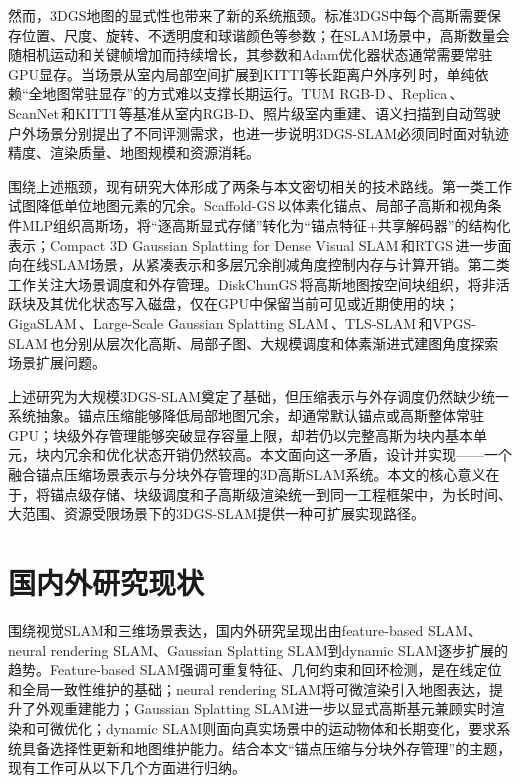 然而，3DGS地图的显式性也带来了新的系统瓶颈。标准3DGS中每个高斯需要保存位置、尺度、旋转、不透明度和球谐颜色等参数；在SLAM场景中，高斯数量会随相机运动和关键帧增加而持续增长，其参数和Adam优化器状态通常需要常驻GPU显存。当场景从室内局部空间扩展到KITTI等长距离户外序列\,\cite{Geiger2012CVPR}时，单纯依赖“全地图常驻显存”的方式难以支撑长期运行。TUM RGB-D\,\cite{sturm2012tum}、Replica\,\cite{straub2019replica}、ScanNet\,\cite{dai2017scannet}和KITTI\,\cite{Geiger2012CVPR}等基准从室内RGB-D、照片级室内重建、语义扫描到自动驾驶户外场景分别提出了不同评测需求，也进一步说明3DGS-SLAM必须同时面对轨迹精度、渲染质量、地图规模和资源消耗。

围绕上述瓶颈，现有研究大体形成了两条与本文密切相关的技术路线。第一类工作试图降低单位地图元素的冗余。Scaffold-GS\,\cite{lu2024scaffoldgs}以体素化锚点、局部子高斯和视角条件MLP组织高斯场，将“逐高斯显式存储”转化为“锚点特征+共享解码器”的结构化表示；Compact 3D Gaussian Splatting for Dense Visual SLAM\,\cite{deng2025compact}和RTGS\,\cite{li2025rtgs}进一步面向在线SLAM场景，从紧凑表示和多层冗余削减角度控制内存与计算开销。第二类工作关注大场景调度和外存管理。DiskChunGS\,\cite{feldmann2026diskchungs}将高斯地图按空间块组织，将非活跃块及其优化状态写入磁盘，仅在GPU中保留当前可见或近期使用的块；GigaSLAM\,\cite{deng2025gigaslam}、Large-Scale Gaussian Splatting SLAM\,\cite{xin2025largescale}、TLS-SLAM\,\cite{cheng2025tlsslam}和VPGS-SLAM\,\cite{deng2026vpgsslam}也分别从层次化高斯、局部子图、大规模调度和体素渐进式建图角度探索场景扩展问题。

上述研究为大规模3DGS-SLAM奠定了基础，但压缩表示与外存调度仍然缺少统一系统抽象。锚点压缩能够降低局部地图冗余，却通常默认锚点或高斯整体常驻GPU；块级外存管理能够突破显存容量上限，却若仍以完整高斯为块内基本单元，块内冗余和优化状态开销仍然较高。本文面向这一矛盾，设计并实现\ScaffoldChunGS——一个融合锚点压缩场景表示与分块外存管理的3D高斯SLAM系统。本文的核心意义在于，将锚点级存储、块级调度和子高斯级渲染统一到同一工程框架中，为长时间、大范围、资源受限场景下的3DGS-SLAM提供一种可扩展实现路径。

\section{国内外研究现状}

围绕视觉SLAM和三维场景表达，国内外研究呈现出由feature-based SLAM、neural rendering SLAM、Gaussian Splatting SLAM到dynamic SLAM逐步扩展的趋势。Feature-based SLAM强调可重复特征、几何约束和回环检测，是在线定位和全局一致性维护的基础；neural rendering SLAM将可微渲染引入地图表达，提升了外观重建能力；Gaussian Splatting SLAM进一步以显式高斯基元兼顾实时渲染和可微优化；dynamic SLAM则面向真实场景中的运动物体和长期变化，要求系统具备选择性更新和地图维护能力。结合本文“锚点压缩与分块外存管理”的主题，现有工作可从以下几个方面进行归纳。

